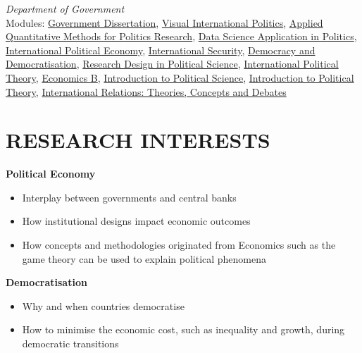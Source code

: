 \documentclass[a4paper,9pt]{extarticle}
\begin{document}
\textit{Department of Government}\vspace{0.1cm}\\ %
Modules: \href{https://www.lse.ac.uk/resources/calendar2022-2023/courseGuides/GV/2022_GV390.htm}{Government Dissertation}, \href{https://www.lse.ac.uk/resources/calendar2022-2023/courseGuides/IR/2022_IR318.htm}{Visual International Politics}, \href{https://www.lse.ac.uk/resources/calendar2022-2023/courseGuides/GV/2022_GV324.htm}{Applied Quantitative Methods for Politics Research}, 
\href{https://www.lse.ac.uk/resources/calendar2022-2023/courseGuides/GV/2022_GV330.htm}{Data Science Application in Politics}, \href{https://www.lse.ac.uk/resources/calendar2022-2023/courseGuides/IR/2022_IR206.htm}{International Political Economy}, \href{https://www.lse.ac.uk/resources/calendar2021-2022/courseGuides/IR/2021_IR205.htm}{International Security}, \href{https://www.lse.ac.uk/resources/calendar2021-2022/courseGuides/GV/2021_GV245.htm}{Democracy and 
Democratisation}, \href{https://www.lse.ac.uk/resources/calendar2021-2022/courseGuides/GV/2021_GV249.htm}{Research Design in Political Science}, \href{https://www.lse.ac.uk/resources/calendar2021-2022/courseGuides/IR/2021_IR200.htm}{International Political Theory}, \href{https://www.lse.ac.uk/resources/calendar2020-2021/courseGuides/EC/2020_EC102.htm}{Economics B}, \href{https://www.lse.ac.uk/resources/calendar2020-2021/courseGuides/GV/2020_GV101.htm}{Introduction to 
Political Science}, \href{https://www.lse.ac.uk/resources/calendar2020-2021/courseGuides/GV/2020_GV100.htm}{Introduction to Political Theory}, \href{https://www.lse.ac.uk/resources/calendar2020-2021/courseGuides/IR/2020_IR100.htm}{International Relations: Theories, Concepts and Debates}

\section*{RESEARCH INTERESTS}
\noindent
\textbf{Political Economy}
\begin{itemize}
    \item Interplay between governments and central banks
    \item How institutional designs impact economic outcomes
    \item How concepts and methodologies originated from Economics such as the game theory can be used to explain political phenomena
\end{itemize}
\noindent
\textbf
{Democratisation}
\begin{itemize}
    \item Why and when countries democratise
    \item How to minimise the economic cost, such as inequality and growth, during democratic transitions
\end{itemize}
\end{document}
